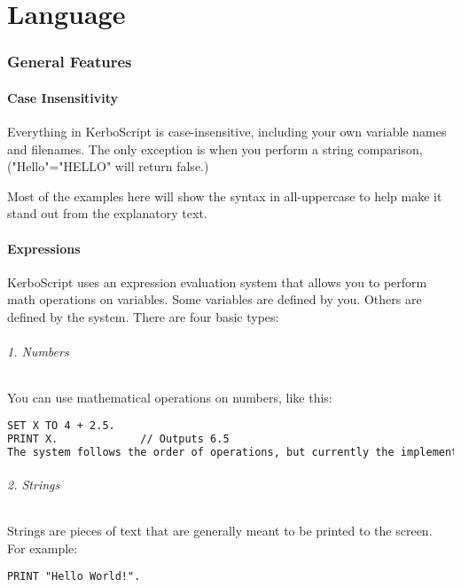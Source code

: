 \part{Language}
	\section{General Features}
		\subsection{Case Insensitivity}
Everything in KerboScript is case-insensitive, including your own variable names and filenames. The only exception is when you perform a string comparison, ("Hello"="HELLO" will return false.)

Most of the examples here will show the syntax in all-uppercase to help make it stand out from the explanatory text.

\subsection{Expressions}
KerboScript uses an expression evaluation system that allows you to perform math operations on variables. Some variables are defined by you. Others are defined by the system. There are four basic types:

\paragraph{1. Numbers}
You can use mathematical operations on numbers, like this:

\begin{lstlisting}[frame=single,language=XML]
SET X TO 4 + 2.5.
PRINT X.             // Outputs 6.5
The system follows the order of operations, but currently the implementation is imperfect. For example, multiplication will always be performed before division, regardless of the order they come in. This will be fixed in a future release.
\end{lstlisting}

\paragraph{2. Strings}
Strings are pieces of text that are generally meant to be printed to the screen. For example:

\begin{lstlisting}[frame=single,language=XML]
PRINT "Hello World!".
\end{lstlisting}

